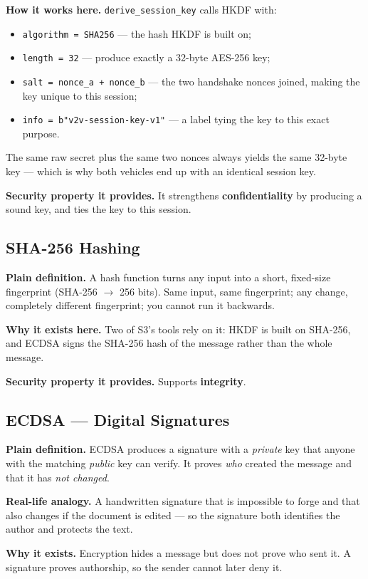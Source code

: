 \documentclass[11pt,a4paper]{article}
\begin{document}
\textbf{How it works here.} \texttt{derive\_session\_key} calls HKDF with:
\begin{itemize}
  \item \texttt{algorithm = SHA256} --- the hash HKDF is built on;
  \item \texttt{length = 32} --- produce exactly a 32-byte AES-256 key;
  \item \texttt{salt = nonce\_a + nonce\_b} --- the two handshake nonces joined,
        making the key unique to this session;
  \item \texttt{info = b"v2v-session-key-v1"} --- a label tying the key to this
        exact purpose.
\end{itemize}
The same raw secret plus the same two nonces always yields the same 32-byte key
--- which is why both vehicles end up with an identical session key.

\textbf{Security property it provides.} It strengthens \textbf{confidentiality}
by producing a sound key, and ties the key to this session.

\subsection{SHA-256 Hashing}
\textbf{Plain definition.} A hash function turns any input into a short,
fixed-size fingerprint (SHA-256 $\to$ 256 bits). Same input, same fingerprint;
any change, completely different fingerprint; you cannot run it backwards.

\textbf{Why it exists here.} Two of S3's tools rely on it: HKDF is built on
SHA-256, and ECDSA signs the SHA-256 hash of the message rather than the whole
message.

\textbf{Security property it provides.} Supports \textbf{integrity}.

\subsection{ECDSA --- Digital Signatures}
\textbf{Plain definition.} ECDSA produces a signature with a \emph{private} key
that anyone with the matching \emph{public} key can verify. It proves \emph{who}
created the message and that it has \emph{not changed}.

\textbf{Real-life analogy.} A handwritten signature that is impossible to forge
and that also changes if the document is edited --- so the signature both
identifies the author and protects the text.

\textbf{Why it exists.} Encryption hides a message but does not prove who sent
it. A signature proves authorship, so the sender cannot later deny it.
\end{document}

